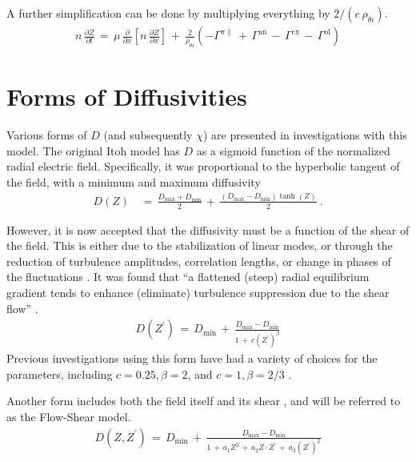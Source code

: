 A further simplification can be done by multiplying everything by $2 / (e \, \rho_{\theta i})$.
\begin{align}
	n \, \frac{\partial Z}{\partial t} \,=\, \mu \, \frac{\partial}{\partial x}
		\left[n \, \frac{\partial Z}{\partial x}\right] \,+\,
		\frac{2}{\rho_{\theta i}} \left(-\Gamma^{\pi\parallel} \,+\,
		\Gamma^\text{an} \,-\, \Gamma^\text{cx} \,-\, \Gamma^\text{ol}\right)
		\label{eq:reduced_normalized_Z_equation}
\end{align}

\section{Forms of Diffusivities}\label{sec:diffusivities}
Various forms of $D$ (and subsequently $\chi$) are presented in investigations with this model.
The original Itoh model has $D$ as a sigmoid function of the normalized radial electric field.
Specifically, it was proportional to the hyperbolic tangent of the field, with a minimum and maximum diffusivity \cite{itoh_edge_1991, zohm_dynamic_1994}
\begin{align} %
	D(Z) \,&=\, \frac{D_\text{max} + D_\text{min}}{2} \,+\,
		\frac{(D_\text{max} - D_\text{min})\tanh(Z)}{2}~.
		\label{eq:Itoh_diffusivity}
\end{align}

However, it is now accepted that the diffusivity must be a function of the shear of the field.
This is either due to the stabilization of linear modes, or through the reduction of turbulence amplitudes, correlation lengths, or change in phases of the fluctuations \cite{connor_review_2000}.
It was found that ``a flattened (steep) radial equilibrium gradient tends to enhance (eliminate) turbulence suppression due to the shear flow'' \cite{zhang_edge_1992}.
\begin{align} %
	D(Z^{\prime}) \,=\, D_\text{min} \,+\, \frac{D_\text{max} - D_\text{min}}
		{1 \,+\, c(Z^{\prime})^{\beta}} \label{eq:shear_diffusivity}
\end{align}
Previous investigations using this form have had a variety of choices for the parameters, including $c = 0.25, \beta = 2$, and $c = 1, \beta = 2/3$ \cite{connor_review_2000} \cite{itoh_theoretical_1994}.

Another form includes both the field itself and its shear \cite{paquay_studying_2012}, and will be referred to as the Flow-Shear model.
\begin{align} %
	D(Z, Z^{\prime}) \,=\, D_\text{min} \,+\,
		\frac{D_\text{max} - D_\text{min}}{1 \,+\, a_1 Z^2 \,+\,
		a_2 Z \cdot Z^{\prime} \,+\, a_3 (Z^{\prime})^2}
		\label{eq:flow_shear_diffusivity}
\end{align}

